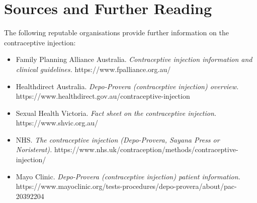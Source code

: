 \section*{Sources and Further Reading}
The following reputable organisations provide further information on the contraceptive injection:
\begin{itemize}
    \item Family Planning Alliance Australia. \textit{Contraceptive injection information and clinical guidelines.} https://www.fpalliance.org.au/
    \item Healthdirect Australia. \textit{Depo-Provera (contraceptive injection) overview.} https://www.healthdirect.gov.au/contraceptive-injection
    \item Sexual Health Victoria. \textit{Fact sheet on the contraceptive injection.} https://www.shvic.org.au/
    \item NHS. \textit{The contraceptive injection (Depo-Provera, Sayana Press or Noristerat).} https://www.nhs.uk/contraception/methods/contraceptive-injection/
    \item Mayo Clinic. \textit{Depo-Provera (contraceptive injection) patient information.} https://www.mayoclinic.org/tests-procedures/depo-provera/about/pac-20392204
\end{itemize}
